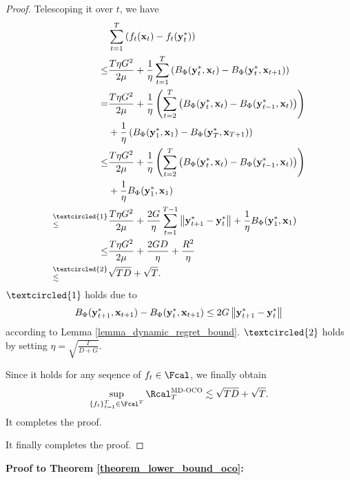 \documentclass[journal]{IEEEtran}
\begin{document}
\begin{proof}
Telescoping it over $t$, we have
\begin{align}
\nonumber
& \sum_{t=1}^T \lrincir{f_t(\x_t) -f_t(\y_t^\ast) } \\ \nonumber
\le & \frac{ T \eta G^2}{2\mu} + \frac{1}{\eta} \sum_{t=1}^T \lrincir{ B_{\Phi}(\y_t^\ast, \x_t) -  B_{\Phi}(\y_t^\ast, \x_{t+1}) } \\ \nonumber
= & \frac{ T \eta G^2}{2\mu} + \frac{1}{\eta} \lrincir{\sum_{t=2}^T \lrincir{ B_{\Phi}(\y_t^\ast, \x_t) -  B_{\Phi}(\y_{t-1}^\ast, \x_t) } } \\ \nonumber
& + \frac{1}{\eta} \lrincir{ B_{\Phi}(\y_1^\ast, \x_1) - B_{\Phi}(\y_T^\ast, \x_{T+1}) }\\ \nonumber
\le & \frac{ T \eta G^2}{2\mu} + \frac{1}{\eta} \lrincir{\sum_{t=2}^T \lrincir{ B_{\Phi}(\y_t^\ast, \x_t) -  B_{\Phi}(\y_{t-1}^\ast, \x_t) } } \\ \nonumber
& + \frac{1}{\eta} B_{\Phi}(\y_1^\ast, \x_1) \\ \nonumber
\refabovecir{\le}{\textcircled{1}} & \frac{ T \eta G^2}{2\mu} + \frac{2G}{\eta}\sum_{t=1}^{T-1}\lrnorm{\y_{t+1}^\ast - \y_t^\ast}    + \frac{1}{\eta} B_{\Phi}(\y_1^\ast, \x_1) \\ \nonumber
\le & \frac{ T \eta G^2}{2\mu} + \frac{2GD}{\eta}  + \frac{R^2}{\eta} \\ \nonumber
\refabovecir{\lesssim}{\textcircled{2}}  & \sqrt{TD}  + \sqrt{T}.
\end{align} $\textcircled{1}$ holds due to 
\begin{align}
\nonumber
B_\Phi({\bf y}_{t+1}^\ast, {\bf x}_{t+1}) - B_{\Phi}({\bf y}_t^\ast, {\bf x}_{t+1}) \le  2G \left\lVert{\bf y}_{t+1}^\ast - {\bf y}_t^\ast\right\rVert
\end{align} according to Lemma \ref{lemma_dynamic_regret_bound}. $\textcircled{2}$ holds by setting $ \eta = \sqrt{\frac{T}{D+G}}$.

Since it holds for any seqence of $f_t \in \Fcal$, we finally obtain
\begin{align}
\nonumber
\sup_{\{f_t\}_{t=1}^T \in \Fcal^T}\Rcal_T^{\textsc{MD-OCO}} \lesssim  \sqrt{TD}  + \sqrt{T}.
\end{align} 
It completes the proof.

It finally completes the proof.
\end{proof}


\textbf{Proof to Theorem \ref{theorem_lower_bound_oco}:}
\end{document}
